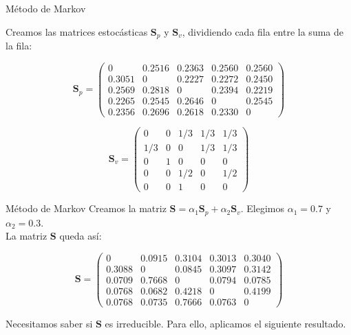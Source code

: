\documentclass[10pt]{beamer}
\begin{document}
	\begin{frame}{Método de Markov}
		\begin{ejemplo}[continuación]
			Creamos las matrices estocásticas $\mathbf{S}_p$ y $\mathbf{S}_v$, dividiendo cada fila entre la suma de la fila:
			
			\[ \mathbf{S}_p = \left(\begin{array}{rrrrr}
			0      & 0.2516 & 0.2363 & 0.2560 & 0.2560 \\
			0.3051 & 0      & 0.2227 & 0.2272 & 0.2450 \\
			0.2569 & 0.2818 & 0      & 0.2394 & 0.2219 \\
			0.2265 & 0.2545 & 0.2646 & 0      & 0.2545 \\
			0.2356 & 0.2696 & 0.2618 & 0.2330 & 0
			\end{array}\right) \] 
			
			\[ \mathbf{S}_v = \left(\begin{array}{rrrrr}
			0     & 0   & 1/3 & 1/3 & 1/3\\
			1/3   & 0   & 0   & 1/3 & 1/3\\
			0     & 1   & 0   & 0   & 0  \\
			0     & 0   & 1/2 & 0   & 1/2\\
			0     & 0   & 1   & 0   & 0
			\end{array}\right) \]
			
			
		\end{ejemplo}
	\end{frame}
	
	\begin{frame}{Método de Markov}
		Creamos la matriz $\mathbf{S} = \alpha_1 \mathbf{S}_p + \alpha_2 \mathbf{S}_v$. Elegimos $\alpha_1 = 0.7$ y $\alpha_2 = 0.3$.\\
		
		La matriz $\mathbf{S}$ queda así:
		
		\[ \mathbf{S} = \left(\begin{array}{rrrrr}
		0      & 0.0915 & 0.3104 & 0.3013 & 0.3040 \\
		0.3088 & 0      & 0.0845 & 0.3097 & 0.3142 \\
		0.0709 & 0.7668 & 0      & 0.0794 & 0.0785 \\
		0.0768 & 0.0682 & 0.4218 & 0      & 0.4199 \\
		0.0768 & 0.0735 & 0.7666 & 0.0763 & 0
		
		\end{array}\right) \]
		
		Necesitamos saber si $\mathbf{S}$ es irreducible. Para ello, aplicamos el siguiente resultado.
	\end{frame}
	
\end{document}
